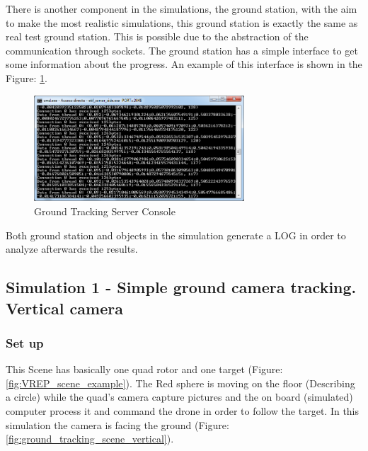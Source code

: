 There is another component in the simulations, the ground station, with the aim to make the most realistic simulations, this ground station is exactly the same as real test ground station. This is possible due to the abstraction of the communication through sockets. The ground station has a simple interface to get some information about the progress. An example of this interface is shown in the Figure: \ref{fig:Ground_Tracking_Server_Console}.

\begin{figure}[h]
	\includegraphics[width=0.7\textwidth,natwidth=677,natheight=342]{../Images/c3/ground_tracking_server_console.png}
	\caption{Ground Tracking Server Console}
	\label{fig:Ground_Tracking_Server_Console}
\end{figure}

Both ground station and objects in the simulation generate a LOG in order to analyze afterwards the results.

\subsection{Simulation 1 - Simple ground camera tracking. Vertical camera}
\subsubsection{Set up}
This Scene has basically one quad rotor and one target (Figure: \ref{fig:VREP_scene_example}). The Red sphere is moving on the floor (Describing a circle) while the quad's camera capture pictures and the on board (simulated) computer process it and command the drone in order to follow the target. In this simulation the camera is facing the ground (Figure: \ref{fig:ground_tracking_scene_vertical}).

